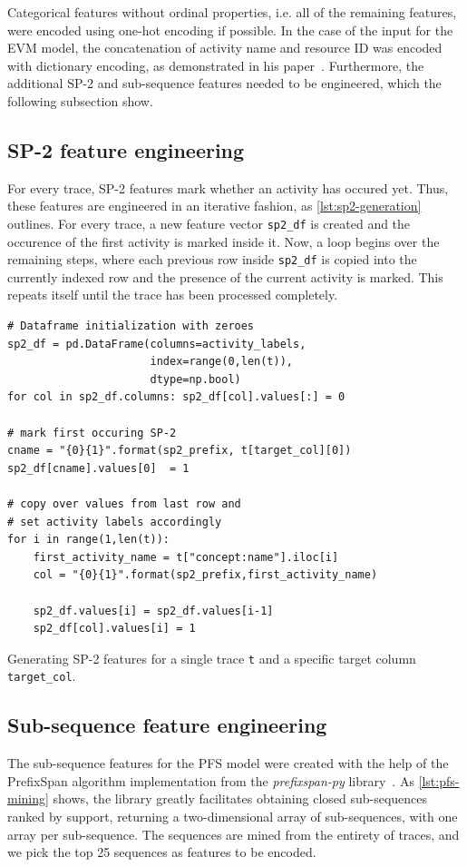 Categorical features without ordinal properties, i.e. all of the remaining features, were encoded using one-hot encoding if possible. In the case of the input for the EVM model, the concatenation of activity name and resource ID was encoded with dictionary encoding, as demonstrated in his paper~\cite{evermann2016}. Furthermore, the additional SP-2 and sub-sequence features needed to be engineered, which the following subsection show.

\subsection*{SP-2 feature engineering}
For every trace, SP-2 features mark whether an activity has occured yet. Thus, these features are engineered in an iterative fashion, as \autoref{lst:sp2-generation} outlines. For every trace, a new feature vector \texttt{sp2\_df} is created and the occurence of the first activity is marked inside it. Now, a loop begins over the remaining steps, where each previous row inside \texttt{sp2\_df} is copied into the currently indexed row and the presence of the current activity is marked. This repeats itself until the trace has been processed completely.

\begin{listing}[ht]
\begin{verbatim}
# Dataframe initialization with zeroes
sp2_df = pd.DataFrame(columns=activity_labels,
                      index=range(0,len(t)),
                      dtype=np.bool)
for col in sp2_df.columns: sp2_df[col].values[:] = 0

# mark first occuring SP-2
cname = "{0}{1}".format(sp2_prefix, t[target_col][0])
sp2_df[cname].values[0]  = 1

# copy over values from last row and
# set activity labels accordingly
for i in range(1,len(t)):
    first_activity_name = t["concept:name"].iloc[i]
    col = "{0}{1}".format(sp2_prefix,first_activity_name)

    sp2_df.values[i] = sp2_df.values[i-1]
    sp2_df[col].values[i] = 1
\end{verbatim}
\caption{Generating SP-2 features for a single trace \texttt{t} and a specific target column \texttt{target\_col}.}
\label{lst:sp2-generation}
\end{listing}

\subsection*{Sub-sequence feature engineering}
The sub-sequence features for the PFS model were created with the help of the PrefixSpan algorithm implementation from the \textit{prefixspan-py} library~\cite{web:prefixspan-py}. As \autoref{lst:pfs-mining} shows, the library greatly facilitates obtaining closed sub-sequences ranked by support, returning a two-dimensional array of sub-sequences, with one array per sub-sequence. The sequences are mined from the entirety of traces, and we pick the top 25 sequences as features to be encoded.

